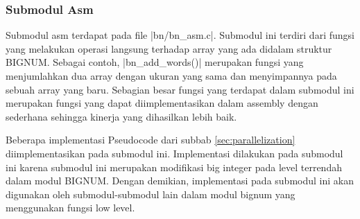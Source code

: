     \subsubsection{Submodul Asm} \label{sec:bn_asm}
      Submodul asm terdapat pada file |bn/bn_asm.c|. Submodul ini terdiri dari fungsi yang melakukan operasi langsung terhadap array yang ada didalam struktur BIGNUM. Sebagai contoh, |bn_add_words()| merupakan fungsi yang menjumlahkan dua array dengan ukuran yang sama dan menyimpannya pada sebuah array yang baru. Sebagian besar fungsi yang terdapat dalam submodul ini merupakan fungsi yang dapat diimplementasikan dalam assembly dengan sederhana sehingga kinerja yang dihasilkan lebih baik.

      Beberapa implementasi Pseudocode dari subbab \ref{sec:parallelization} diimplementasikan pada submodul ini. Implementasi dilakukan pada submodul ini karena submodul ini merupakan modifikasi big integer pada level terrendah dalam modul BIGNUM. Dengan demikian, implementasi pada submodul ini akan digunakan oleh submodul-submodul lain dalam modul bignum yang menggunakan fungsi low level. 

